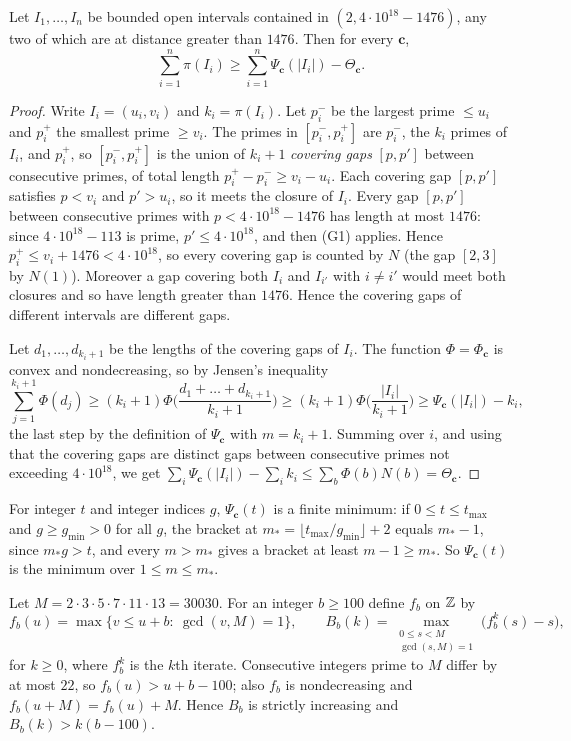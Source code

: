 \documentclass[11pt,colorlinks]{charlie}
\begin{document}
\begin{lemma}\label{lem:convex}
Let $I_1,\dots,I_n$ be bounded open intervals contained in $(2,4\cdot10^{18}-1476)$, any two of which are at distance greater than $1476$. Then for every $\mathbf c$,
\[
 \sum_{i=1}^n\pi(I_i)\ge\sum_{i=1}^n\Psi_{\mathbf c}(|I_i|)-\Theta_{\mathbf c}.
\]
\end{lemma}
\begin{proof}
Write $I_i=(u_i,v_i)$ and $k_i=\pi(I_i)$. Let $p_i^-$ be the largest prime $\le u_i$ and $p_i^+$ the smallest prime $\ge v_i$. The primes in $[p_i^-,p_i^+]$ are $p_i^-$, the $k_i$ primes of $I_i$, and $p_i^+$, so $[p_i^-,p_i^+]$ is the union of $k_i+1$ \emph{covering gaps} $[p,p']$ between consecutive primes, of total length $p_i^+-p_i^-\ge v_i-u_i$. Each covering gap $[p,p']$ satisfies $p<v_i$ and $p'>u_i$, so it meets the closure of $I_i$. Every gap $[p,p']$ between consecutive primes with $p<4\cdot10^{18}-1476$ has length at most $1476$: since $4\cdot10^{18}-113$ is prime, $p'\le4\cdot10^{18}$, and then (G1) applies. Hence $p_i^+\le v_i+1476<4\cdot10^{18}$, so every covering gap is counted by $N$ (the gap $[2,3]$ by $N(1)$). Moreover a gap covering both $I_i$ and $I_{i'}$ with $i\ne i'$ would meet both closures and so have length greater than $1476$. Hence the covering gaps of different intervals are different gaps.

Let $d_1,\dots,d_{k_i+1}$ be the lengths of the covering gaps of $I_i$. The function $\Phi=\Phi_{\mathbf c}$ is convex and nondecreasing, so by Jensen's inequality
\[
 \sum_{j=1}^{k_i+1}\Phi(d_j)\ge(k_i+1)\Phi\Big(\frac{d_1+\dots+d_{k_i+1}}{k_i+1}\Big)\ge(k_i+1)\Phi\Big(\frac{|I_i|}{k_i+1}\Big)\ge\Psi_{\mathbf c}(|I_i|)-k_i,
\]
the last step by the definition of $\Psi_{\mathbf c}$ with $m=k_i+1$. Summing over $i$, and using that the covering gaps are distinct gaps between consecutive primes not exceeding $4\cdot10^{18}$, we get $\sum_i\Psi_{\mathbf c}(|I_i|)-\sum_ik_i\le\sum_b\Phi(b)N(b)=\Theta_{\mathbf c}$.
\end{proof}

For integer $t$ and integer indices $g$, $\Psi_{\mathbf c}(t)$ is a finite minimum: if $0\le t\le t_{\max}$ and $g\ge g_{\min}>0$ for all $g$, the bracket at $m_*=\lfloor t_{\max}/g_{\min}\rfloor+2$ equals $m_*-1$, since $m_*g>t$, and every $m>m_*$ gives a bracket at least $m-1\ge m_*$. So $\Psi_{\mathbf c}(t)$ is the minimum over $1\le m\le m_*$.

Let $M=2\cdot3\cdot5\cdot7\cdot11\cdot13=30030$. For an integer $b\ge100$ define $f_b$ on $\mathbb{Z}$ by
\[
 f_b(u)=\max\{v\le u+b:\ \gcd(v,M)=1\},\qquad B_b(k)=\max_{\substack{0\le s<M\\ \gcd(s,M)=1}}\big(f_b^{k}(s)-s\big),
\]
for $k\ge0$, where $f_b^k$ is the $k$th iterate. Consecutive integers prime to $M$ differ by at most $22$, so $f_b(u)>u+b-100$; also $f_b$ is nondecreasing and $f_b(u+M)=f_b(u)+M$. Hence $B_b$ is strictly increasing and $B_b(k)>k(b-100)$.
\end{document}

